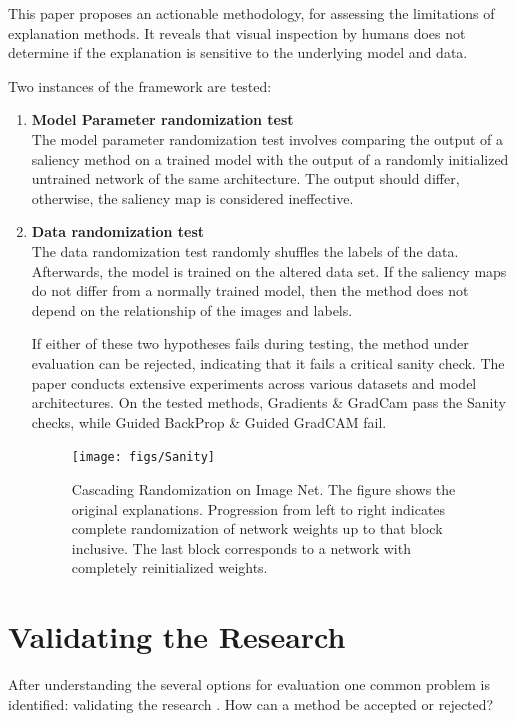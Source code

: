 This paper proposes an actionable methodology, for assessing the limitations of explanation methods. It reveals that visual inspection by humans does not determine if the explanation is sensitive to the underlying model and data.

Two instances of the framework are tested:

\begin{enumerate}
	\item \textbf{Model Parameter randomization test}\\
		The model parameter randomization test involves comparing the output of a saliency method on a trained model with the output of a randomly initialized untrained network of the same architecture. The output should differ, otherwise, the saliency map is considered ineffective.
	\item \textbf{Data randomization test}\\
		The data randomization test randomly shuffles the labels of the data. Afterwards, the model is trained on the altered data set. If the saliency maps do not differ from a normally trained model, then the method does not depend on the relationship of the images and labels.

If either of these two hypotheses fails during testing, the method under evaluation can be rejected, indicating that it fails a critical sanity check. The paper conducts extensive experiments across various datasets and model architectures. On the tested methods, Gradients \& GradCam pass the Sanity checks, while Guided BackProp \& Guided GradCAM fail.

\begin{figure}[h!]
	\centering
	\texttt{[image: figs/Sanity]}
	\caption[Cascading Randomization on Image Net.]{Cascading Randomization on Image Net. The figure shows the original explanations. Progression from left to right indicates complete randomization of network weights up to that block inclusive. The last block corresponds to a network with completely reinitialized weights. \cite{adebayo2020sanity}}
	\label{fig:Sanity}
\end{figure}

\end{enumerate}


\section{Validating the Research}

After understanding the several options for evaluation one common problem is identified: validating the research \cite{allen2023interpretable}. How can a method be accepted or rejected?

